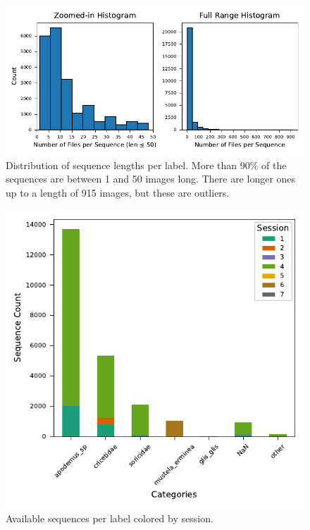     

    \begin{figure}[H]
    \centering
    \includegraphics{figures/seq_len_histograms.pdf}
    \caption{Distribution of sequence lengths per label. More than 90\% of the sequences are between 1 and 50 images long. There are longer ones up to a length of 915 images, but these are outliers.}
    \label{fig:seq_len_histograms}
    \end{figure}

    \begin{figure}[H]
    \centering
    \includegraphics{figures/label2_session.pdf}
    \caption{Available sequences per label colored by session.}
    \label{fig:sequenceperlabel}
    \end{figure}

